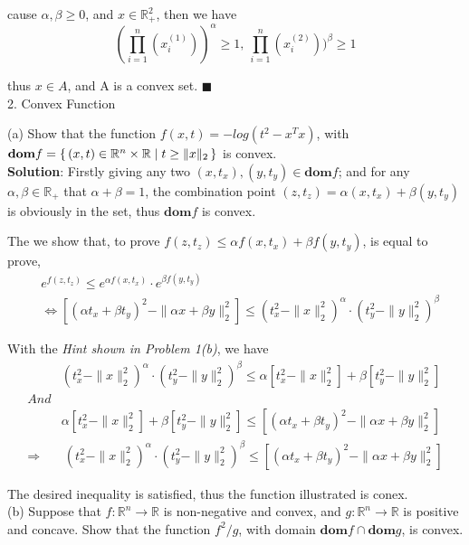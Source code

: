 \documentclass{article}
\begin{document}
cause $\alpha, \beta \geq 0$, and $ x \in \mathbb{R}_+^2$, then we have
\[
	(\prod^n_{i=1}(x^{(1)}_i))^\alpha \geq 1,\ \prod^n_{i=1}(x^{(2)}_i))^\beta \geq 1
\]

thus $x \in A$, and A is a convex set. $\blacksquare$ \\

2. Convex Function

(a) Show that the function $f(x,t) = -log(t^2 - x^Tx)$, with $\textbf{dom} f=\set{(x,t) \in \mathbb{R}^n \times \mathbb{R} | t \geq \|x\|_2}$ is convex. \\

\textbf{Solution}:
Firstly giving any two $ (x, t_x),(y, t_y) \in \textbf{dom}f $; and for any $\alpha, \beta \in \mathbb{R}_+$ that $\alpha + \beta = 1$, the combination point $ (z, t_z) = \alpha (x, t_x) + \beta (y, t_y)$ is obviously in the set, thus $\textbf{dom} f$ is convex.

The we show that, to prove $f(z, t_z) \leq \alpha f(x, t_x) + \beta f(y, t_y)$, is equal to prove, 
\begin{align*}
	&e^{f(z, t_z)} \leq e^{\alpha f(x, t_x)} \cdot e^{\beta f(y, t_y)} \\
	&\Leftrightarrow [(\alpha t_x + \beta t_y)^2 - \|\alpha x + \beta y\|^2_2] \leq (t_x^2 - \|x\|^2_2)^{\alpha}
		\cdot (t_y^2 - \|y\|^2_2)^{\beta}
\end{align*}

With the \textit{Hint shown in Problem 1(b)}, we have
\begin{align*}
	&(t_x^2 - \|x\|^2_2)^{\alpha} \cdot (t_y^2 - \|y\|^2_2)^{\beta}
		\leq \alpha[t_x^2 - \|x\|^2_2] + \beta [t_y^2 - \|y\|^2_2] \\
	And& \\
	&\alpha[t_x^2 - \|x\|^2_2] + \beta [t_y^2 - \|y\|^2_2] \leq [(\alpha t_x + \beta t_y)^2 - \|\alpha x + \beta y\|^2_2] \\
	\Rightarrow&\ (t_x^2 - \|x\|^2_2)^{\alpha} \cdot (t_y^2 - \|y\|^2_2)^{\beta}
					\leq [(\alpha t_x + \beta t_y)^2 - \|\alpha x + \beta y\|^2_2]
\end{align*}

The desired inequality is satisfied, thus the function illustrated is conex. \\

(b) Suppose that $f:\mathbb{R}^n \to \mathbb{R}$ is non-negative and convex, and $g:\mathbb{R}^n \to \mathbb{R} $ is positive and concave. Show that the function $f^2/g$, with domain $\textbf{dom}f \cap \textbf{dom}g$, is convex. \\
\end{document}
